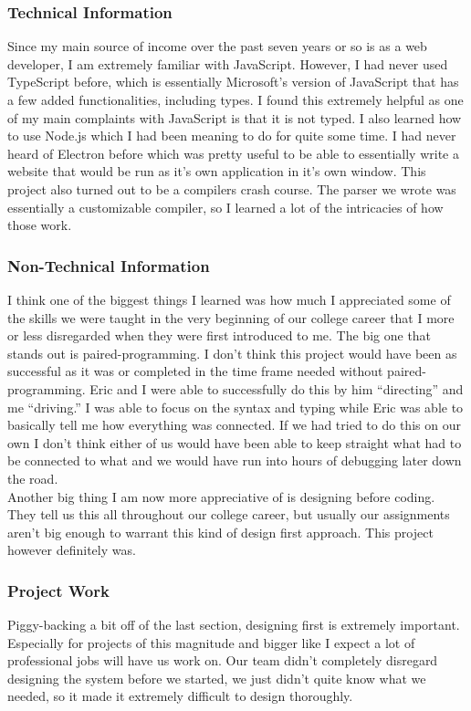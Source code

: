 \documentclass[letterpaper,10pt,titlepage,draftclsnofoot,onecolumn,onesided] {IEEEtran}
\begin{document}
\subsubsection{Technical Information}
Since my main source of income over the past seven years or so is as a web developer, I am extremely familiar with JavaScript.
However, I had never used TypeScript before, which is essentially Microsoft's version of JavaScript that has a few added functionalities, including types.
I found this extremely helpful as one of my main complaints with JavaScript is that it is not typed.
I also learned how to use Node.js which I had been meaning to do for quite some time.
I had never heard of Electron before which was pretty useful to be able to essentially write a website that would be run as it's own application in it's own window.
This project also turned out to be a compilers crash course.
The parser we wrote was essentially a customizable compiler, so I learned a lot of the intricacies of how those work.\\

\subsubsection{Non-Technical Information}
I think one of the biggest things I learned was how much I appreciated some of the skills we were taught in the very beginning of our college career that I more or less disregarded when they were first introduced to me.
The big one that stands out is paired-programming.
I don't think this project would have been as successful as it was or completed in the time frame needed without paired-programming.
Eric and I were able to successfully do this by him ``directing'' and me ``driving.''
I was able to focus on the syntax and typing while Eric was able to basically tell me how everything was connected.
If we had tried to do this on our own I don't think either of us would have been able to keep straight what had to be connected to what and we would have run into hours of debugging later down the road. \\

Another big thing I am now more appreciative of is designing before coding.
They tell us this all throughout our college career, but usually our assignments aren't big enough to warrant this kind of design first approach.
This project however definitely was.\\

\subsubsection{Project Work}
Piggy-backing a bit off of the last section, designing first is extremely important.
Especially for projects of this magnitude and bigger like I expect a lot of professional jobs will have us work on.
Our team didn't completely disregard designing the system before we started, we just didn't quite know what we needed, so it made it extremely difficult to design thoroughly. \\
\end{document}
